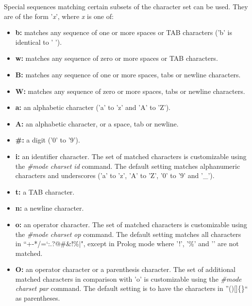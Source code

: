 Special sequences matching certain subsets of the character set can be used.
They are of the form '{\htmlBackslash}{\it x}', where {\it x} is one of: 

\begin{itemize}

\item {\bf b:} matches any sequence of one or more spaces or TAB characters
('{\htmlBackslash}b' is identical to ' '). 

\item {\bf w:} matches any sequence of zero or more spaces or TAB characters. 

\item {\bf B:} matches any sequence of one or more spaces, tabs or newline
characters. 

\item {\bf W:} matches any sequence of zero or more spaces, tabs or newline
characters. 

\item {\bf a:} an alphabetic character ('a' to 'z' and 'A' to 'Z'). 

\item {\bf A:} an alphabetic character, or a space, tab or newline. 

\item {\bf \#:} a digit ('0' to '9'). 

\item {\bf i:} an identifier character. The set of matched characters is
customizable using the {\it \#mode charset id} command. The default setting
matches alphanumeric characters and underscores ('a' to 'z', 'A' to 'Z', '0'
to '9' and '\_'). 

\item {\bf t:} a TAB character. 

\item {\bf n:} a newline character. 

\item {\bf o:} an operator character. The set of matched characters is
customizable using the {\it \#mode charset op} command. The default setting
matches all characters in
``+-*/{\htmlBackslash}{\htmlHat}{\htmlLt}{\htmlGt}=`{\htmlTilde}:.?@\#\&!\%$\mid$",
except in Prolog mode where '!', '\%' and '{\htmlBar}' are not matched. 

\item {\bf O:} an operator character or a parenthesis character. The set of
additional matched characters in comparison with '{\htmlBackslash}o' is
customizable using the {\it \#mode charset par} command. The default setting
is to have the characters in ''()[]\{\}`` as parentheses.
\end{itemize}


